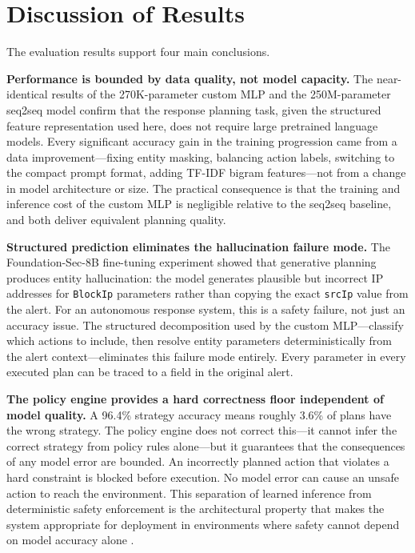 \section{Discussion of Results}
\label{sec:eval-results-discussion}

The evaluation results support four main conclusions.

\textbf{Performance is bounded by data quality, not model capacity.} The near-identical results of the 270K-parameter custom MLP and the 250M-parameter seq2seq model confirm that the response planning task, given the structured feature representation used here, does not require large pretrained language models. Every significant accuracy gain in the training progression came from a data improvement---fixing entity masking, balancing action labels, switching to the compact prompt format, adding TF-IDF bigram features---not from a change in model architecture or size. The practical consequence is that the training and inference cost of the custom MLP is negligible relative to the seq2seq baseline, and both deliver equivalent planning quality.

\textbf{Structured prediction eliminates the hallucination failure mode.} The Foundation-Sec-8B fine-tuning experiment showed that generative planning produces entity hallucination: the model generates plausible but incorrect IP addresses for \texttt{BlockIp} parameters rather than copying the exact \texttt{srcIp} value from the alert. For an autonomous response system, this is a safety failure, not just an accuracy issue. The structured decomposition used by the custom MLP---classify which actions to include, then resolve entity parameters deterministically from the alert context---eliminates this failure mode entirely. Every parameter in every executed plan can be traced to a field in the original alert.

\textbf{The policy engine provides a hard correctness floor independent of model quality.} A 96.4\% strategy accuracy means roughly 3.6\% of plans have the wrong strategy. The policy engine does not correct this---it cannot infer the correct strategy from policy rules alone---but it guarantees that the consequences of any model error are bounded. An incorrectly planned action that violates a hard constraint is blocked before execution. No model error can cause an unsafe action to reach the environment. This separation of learned inference from deterministic safety enforcement is the architectural property that makes the system appropriate for deployment in environments where safety cannot depend on model accuracy alone \cite{nist80061}.

